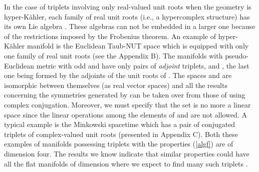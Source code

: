 \documentclass[a4paper,12pt]{article}
\begin{document}
In the case of triplets involving only real-valued unit roots when the 
geometry is  hyper-K\" ahler, each family of real unit roots (i.e., a  
hypercomplex structure) \coordHE{} has its own Lie algebra \coordHE{}. These 
algebras can not be embedded in a larger one because of the restrictions 
imposed by the Frobenius theorem.  An example of hyper-K\" ahler manifold 
is the Euclidean Taub-NUT space which is equipped with only one family of 
real unit roots 
\cite{CV, CV1} (see the Appendix B). The manifolds with 
pseudo-Euclidean metric 
with odd \coordHE{} and \coordHE{} have only pairs of 
{\em adjoint} triplets, \coordHE{} 
and \coordHE{}, the last one being formed by the 
adjoints of the unit roots of \coordHE{}. 
The spaces 
\coordHE{} and \coordHE{} are isomorphic between themselves (as real vector spaces) 
and all the results concerning the symmetries generated by \coordHE{} can be taken 
over from those of \coordHE{} using complex conjugation. Moreover, we must specify 
that the set \coordHE{} is no more a linear space since the linear 
operations among the elements of \coordHE{} and \coordHE{} are not allowed. A typical 
example is the Minkowski spacetime which has a pair of conjugated triplets of 
complex-valued unit roots \cite{K2} (presented in Appendix C). Both these 
examples of manifolds possessing triplets with the properties (\ref{algf}) are 
of dimension four. The results we know  indicate that similar properties could 
have all the flat manifolds of dimension \coordHE{} where we expect 
to find many such triplets \cite{GM}. 
\end{document}
